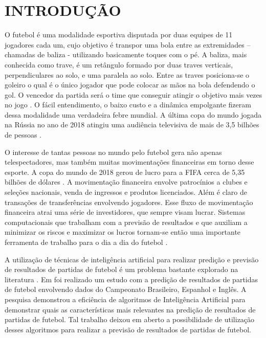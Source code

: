 \newpage
\section{INTRODUÇÃO}
O futebol é uma modalidade esportiva disputada por duas equipes de 11 jogadores cada um, cujo objetivo é transpor uma bola entre as extremidades – chamadas de baliza - utilizando basicamente toques com o pé. A baliza, mais conhecida como trave, é um retângulo formado por duas traves verticais, perpendiculares ao solo, e uma paralela ao solo. Entre as traves posiciona-se o goleiro o qual é o único jogador que pode colocar as mãos na bola defendendo o gol. O vencedor da partida será o time que conseguir atingir o objetivo mais vezes no jogo \cite{Sfeir2011}. O fácil entendimento, o baixo custo e a dinâmica empolgante fizeram dessa modalidade uma verdadeira febre mundial. A última copa do mundo jogada na Rússia no ano de 2018 atingiu uma audiência televisiva de mais de 3,5 bilhões de pessoas \cite{FIFAwatch}.

O interesse de tantas pessoas no mundo pelo futebol gera não apenas telespectadores, mas também muitas movimentações financeiras em torno desse esporte. A copa do mundo de 2018 gerou de lucro para a FIFA cerca de 5,35 bilhões de dólares \cite{FIFAlucro}. A movimentação financeira envolve patrocínios a clubes e seleções nacionais, venda de ingressos e produtos licenciados. Além é claro de transações de transferências envolvendo jogadores. Esse fluxo de movimentação financeira atrai uma série de investidores, que sempre visam lucrar. Sistemas computacionais que trabalham com a previsão de resultados e que auxiliam a minimizar os riscos e maximizar os lucros tornam-se então uma importante ferramenta de trabalho para o dia a dia do futebol \cite{Perin2013}.

A utilização de técnicas de inteligência artificial para realizar predição e previsão de resultados de partidas de futebol é um problema bastante explorado na literatura \cite{Perin2013}. Em  foi realizado um estudo com a predição de resultados de partidas de futebol envolvendo dados do Campeonato Brasileiro, Espanhol e Inglês. A pesquisa demonstrou a eficiência de algoritmos de Inteligência Artificial para demonstrar quais as características mais relevantes na predição de resultados de partidas de futebol. Tal trabalho deixou em aberto a possibilidade de utilização desses algoritmos para realizar a previsão de resultados de partidas de futebol.

